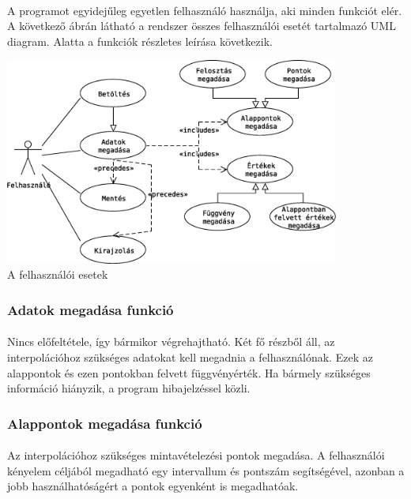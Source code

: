 \documentclass[12pt]{report}
\begin{document}
\paragraph{}
A programot egyidejűleg egyetlen felhasználó használja, aki minden funkciót elér. A következő ábrán látható a rendszer összes felhasználói esetét tartalmazó UML diagram. Alatta a funkciók részletes leírása következik.
\begin{center}
\includegraphics[width=11cm]{pics/uml/use_case}\\
{\footnotesize A felhasználói esetek}
\end{center}

\subsubsection{Adatok megadása funkció}
\paragraph{}
Nincs előfeltétele, így bármikor végrehajtható. Két fő részből áll, az interpolációhoz szükséges adatokat kell megadnia a felhasználónak. Ezek az alappontok és ezen pontokban felvett függvényérték. Ha bármely szükséges információ hiányzik, a program hibajelzéssel közli.

\subsubsection{Alappontok megadása funkció}
\paragraph{}
Az interpolációhoz szükséges mintavételezési pontok megadása. A felhasználói kényelem céljából megadható egy intervallum és pontszám segítségével, azonban a jobb használhatóságért a pontok egyenként is megadhatóak.
\end{document}
